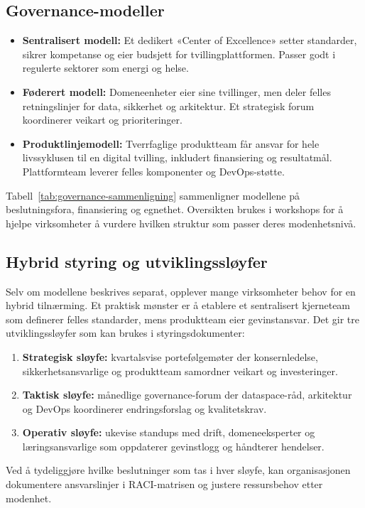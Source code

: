 \subsection*{Governance-modeller}
\begin{itemize}
    \item \textbf{Sentralisert modell:} Et dedikert «Center of Excellence» setter standarder, sikrer kompetanse og eier budsjett for tvillingplattformen. Passer godt i regulerte sektorer som energi og helse.
    \item \textbf{Føderert modell:} Domeneenheter eier sine tvillinger, men deler felles retningslinjer for data, sikkerhet og arkitektur. Et strategisk forum koordinerer veikart og prioriteringer.
    \item \textbf{Produktlinjemodell:} Tverrfaglige produktteam får ansvar for hele livssyklusen til en digital tvilling, inkludert finansiering og resultatmål. Plattformteam leverer felles komponenter og DevOps-støtte.
\end{itemize}

Tabell~\ref{tab:governance-sammenligning} sammenligner modellene på beslutningsfora, finansiering og egnethet. Oversikten brukes i workshops for å hjelpe virksomheter å vurdere hvilken struktur som passer deres modenhetsnivå.

\subsection*{Hybrid styring og utviklingssløyfer}
Selv om modellene beskrives separat, opplever mange virksomheter behov for en hybrid tilnærming. Et praktisk mønster er å etablere et sentralisert kjerneteam som definerer felles standarder, mens produktteam eier gevinstansvar. Det gir tre utviklingssløyfer som kan brukes i styringsdokumenter:
\begin{enumerate}
    \item \textbf{Strategisk sløyfe:} kvartalsvise portefølgemøter der konsernledelse, sikkerhetsansvarlige og produktteam samordner veikart og investeringer.
    \item \textbf{Taktisk sløyfe:} månedlige governance-forum der dataspace-råd, arkitektur og DevOps koordinerer endringsforslag og kvalitetskrav.
    \item \textbf{Operativ sløyfe:} ukevise standups med drift, domeneeksperter og læringsansvarlige som oppdaterer gevinstlogg og håndterer hendelser.
\end{enumerate}
Ved å tydeliggjøre hvilke beslutninger som tas i hver sløyfe, kan organisasjonen dokumentere ansvarslinjer i RACI-matrisen og justere ressursbehov etter modenhet.

